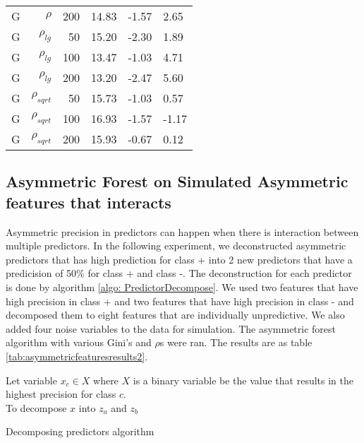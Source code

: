 \documentclass[twoside,11pt]{article}
\begin{document}
\begin{table}
\begin{tabular}{rrrp{2.5cm}p{2.5cm}p{2.5cm}}
G     & $\rho$ & 200   & 14.83 & -1.57 & 2.65 \\
G     & $\rho_{lg}$ & 50    & 15.20 & -2.30 & 1.89 \\
G     & $\rho_{lg}$ & 100   & 13.47 & -1.03 & 4.71 \\
G     & $\rho_{lg}$ & 200   & 13.20 & -2.47 & 5.60 \\
G     & $\rho_{sqrt}$ & 50    & 15.73 & -1.03 & 0.57 \\
G     & $\rho_{sqrt}$ & 100   & 16.93 & -1.57 & -1.17 \\
G     & $\rho_{sqrt}$ & 200   & 15.93 & -0.67 & 0.12 \bigstrut[b]\\
\hline
\end{tabular}%
\label{tab:asymmetricfeaturesresults}%
\end{table}%


\subsection{Asymmetric Forest on Simulated Asymmetric features that interacts}
Asymmetric precision in predictors can happen when there is interaction between multiple predictors. In the following experiment, we deconstructed asymmetric predictors that has high prediction for class + into 2 new predictors that have a predicision of 50\% for class + and class -. The deconstruction for each predictor is done by algorithm \ref{algo: PredictorDecompose}. We used two features that have high precision in class + and two features that have high precision in class - and decomposed them to eight features that are individually unpredictive. We also added four noise variables to the data for simulation. The asymmetric forest algorithm with various Gini's and $\rho$s were ran. The results are as table \ref{tab:asymmetricfeaturesresults2}. 
\begin{algorithm}
Let variable $x_c\in X$ where $X$ is a binary variable be the value that results in the highest precision for class $c$.\\
To decompose $x$ into $z_a$ and $z_b$

\caption{Decomposing predictors algorithm}\label{algo: PredictorDecompose}
\end{algorithm}
\end{document}
